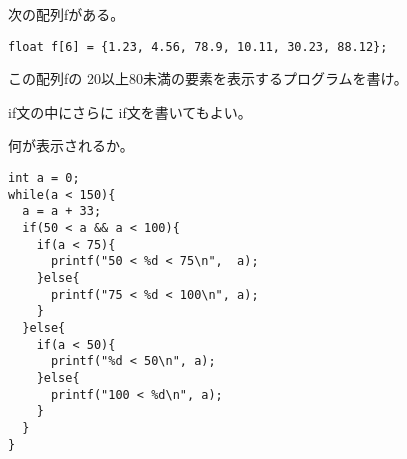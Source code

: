 \documentclass[12pt,a4j]{jarticle}
\newcounter{toi}
\def\toi{%
\bigskip\bigskip\noindent
\addtocounter{toi}{1}
\shadowbox{\bfseries\large 問\thetoi}
\nopagebreak[4]\bigskip\nopagebreak[4]
}
\begin{document}



\toi
\label{toi:array_f}

次の配列{\ttfamily f}がある。
\begin{verbatim}
float f[6] = {1.23, 4.56, 78.9, 10.11, 30.23, 88.12};
\end{verbatim}
この配列{\ttfamily f}の
20以上80未満の要素を表示するプログラムを書け。

\vspace*{5cm}









\toi

{\ttfamily if}文の中にさらに
{\ttfamily if}文を書いてもよい。

何が表示されるか。
\begin{verbatim}
int a = 0;
while(a < 150){
  a = a + 33;
  if(50 < a && a < 100){
    if(a < 75){
      printf("50 < %d < 75\n",  a);
    }else{
      printf("75 < %d < 100\n", a);
    }
  }else{
    if(a < 50){
      printf("%d < 50\n", a);
    }else{
      printf("100 < %d\n", a);
    }
  }
}
\end{verbatim}
\end{document}
